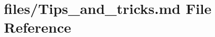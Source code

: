 \hypertarget{Tips__and__tricks_8md}{}\section{files/\+Tips\+\_\+and\+\_\+tricks.md File Reference}
\label{Tips__and__tricks_8md}
